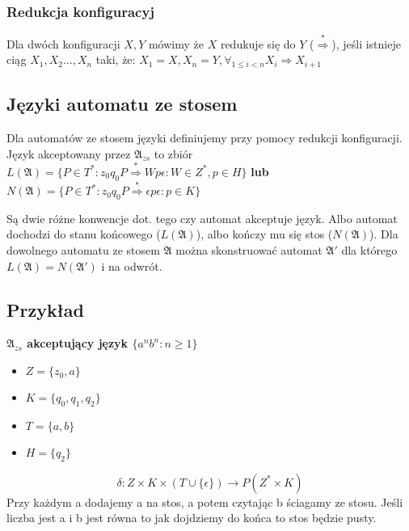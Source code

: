\documentclass{../notatki}
\begin{document}
\subsubsection{Redukcja konfiguracyj}

Dla dwóch konfiguracji $X, Y$ mówimy że $X$ redukuje się do $Y$
($\stackrel{*}{\Rightarrow}$), jeśli istnieje ciąg $X_1,X_2\dots, X_n$ taki, że:
$X_1 = X, X_n = Y, \forall_{1 \le i < n}X_i \Rightarrow X_{i + 1}$

\subsection{Języki automatu ze stosem}

Dla automatów ze stosem języki definiujemy przy pomocy redukcji konfiguracji.
Język akceptowany przez $\mathfrak{A}_{zs}$ to zbiór
$L(\mathfrak{A})=\{P \in T^* : z_0q_0P \stackrel{*}{\Rightarrow}
Wp\epsilon : W \in Z^*, p \in H\}$
\textbf{lub} $N(\mathfrak{A})=\{P \in T^* : z_0q_0P
\stackrel{*}{\Rightarrow} \epsilon p \epsilon : p \in K\}$

Są dwie różne konwencje dot. tego czy automat akceptuje język. Albo automat
dochodzi do stanu końcowego ($L(\mathfrak{A})$), albo kończy mu się
stos ($N(\mathfrak{A})$). Dla dowolnego automatu ze stosem $\mathfrak{A}$ można
skonstruować automat $\mathfrak{A}'$ dla którego
$L(\mathfrak{A})=N(\mathfrak{A}')$ i na odwrót.

\subsection{Przykład}

\textbf{$\mathfrak{A}_{zs}$ akceptujący język $\{a^nb^n : n \ge 1\}$}

\begin{itemize}
  \item $Z = \{z_0, a\}$
  \item $K = \{q_0, q_1, q_2\}$
  \item $T = \{a, b\}$
  \item $H = \{q_2\}$
\end{itemize}

$$
\delta: Z \times K \times (T \cup \{\epsilon\}) \rightarrow P(Z^* \times K)
$$
Przy każdym a dodajemy a na stos, a potem czytając b ściagamy ze stosu. Jeśli
liczba jest a i b jest równa to jak dojdziemy do końca to stos będzie pusty.
\end{document}
